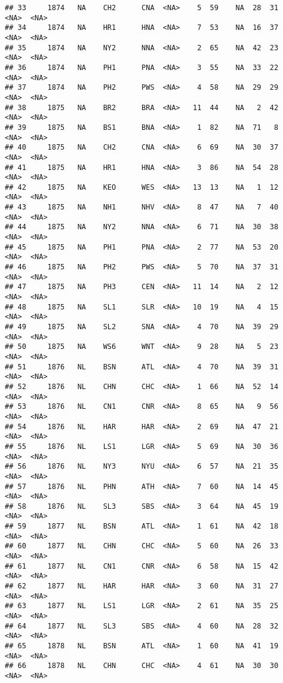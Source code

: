 \documentclass[]{article}
\begin{document}
\begin{verbatim}
## 33     1874   NA    CH2      CNA  <NA>    5  59    NA  28  31   <NA>  <NA>
## 34     1874   NA    HR1      HNA  <NA>    7  53    NA  16  37   <NA>  <NA>
## 35     1874   NA    NY2      NNA  <NA>    2  65    NA  42  23   <NA>  <NA>
## 36     1874   NA    PH1      PNA  <NA>    3  55    NA  33  22   <NA>  <NA>
## 37     1874   NA    PH2      PWS  <NA>    4  58    NA  29  29   <NA>  <NA>
## 38     1875   NA    BR2      BRA  <NA>   11  44    NA   2  42   <NA>  <NA>
## 39     1875   NA    BS1      BNA  <NA>    1  82    NA  71   8   <NA>  <NA>
## 40     1875   NA    CH2      CNA  <NA>    6  69    NA  30  37   <NA>  <NA>
## 41     1875   NA    HR1      HNA  <NA>    3  86    NA  54  28   <NA>  <NA>
## 42     1875   NA    KEO      WES  <NA>   13  13    NA   1  12   <NA>  <NA>
## 43     1875   NA    NH1      NHV  <NA>    8  47    NA   7  40   <NA>  <NA>
## 44     1875   NA    NY2      NNA  <NA>    6  71    NA  30  38   <NA>  <NA>
## 45     1875   NA    PH1      PNA  <NA>    2  77    NA  53  20   <NA>  <NA>
## 46     1875   NA    PH2      PWS  <NA>    5  70    NA  37  31   <NA>  <NA>
## 47     1875   NA    PH3      CEN  <NA>   11  14    NA   2  12   <NA>  <NA>
## 48     1875   NA    SL1      SLR  <NA>   10  19    NA   4  15   <NA>  <NA>
## 49     1875   NA    SL2      SNA  <NA>    4  70    NA  39  29   <NA>  <NA>
## 50     1875   NA    WS6      WNT  <NA>    9  28    NA   5  23   <NA>  <NA>
## 51     1876   NL    BSN      ATL  <NA>    4  70    NA  39  31   <NA>  <NA>
## 52     1876   NL    CHN      CHC  <NA>    1  66    NA  52  14   <NA>  <NA>
## 53     1876   NL    CN1      CNR  <NA>    8  65    NA   9  56   <NA>  <NA>
## 54     1876   NL    HAR      HAR  <NA>    2  69    NA  47  21   <NA>  <NA>
## 55     1876   NL    LS1      LGR  <NA>    5  69    NA  30  36   <NA>  <NA>
## 56     1876   NL    NY3      NYU  <NA>    6  57    NA  21  35   <NA>  <NA>
## 57     1876   NL    PHN      ATH  <NA>    7  60    NA  14  45   <NA>  <NA>
## 58     1876   NL    SL3      SBS  <NA>    3  64    NA  45  19   <NA>  <NA>
## 59     1877   NL    BSN      ATL  <NA>    1  61    NA  42  18   <NA>  <NA>
## 60     1877   NL    CHN      CHC  <NA>    5  60    NA  26  33   <NA>  <NA>
## 61     1877   NL    CN1      CNR  <NA>    6  58    NA  15  42   <NA>  <NA>
## 62     1877   NL    HAR      HAR  <NA>    3  60    NA  31  27   <NA>  <NA>
## 63     1877   NL    LS1      LGR  <NA>    2  61    NA  35  25   <NA>  <NA>
## 64     1877   NL    SL3      SBS  <NA>    4  60    NA  28  32   <NA>  <NA>
## 65     1878   NL    BSN      ATL  <NA>    1  60    NA  41  19   <NA>  <NA>
## 66     1878   NL    CHN      CHC  <NA>    4  61    NA  30  30   <NA>  <NA>

\end{verbatim}
\end{document}
